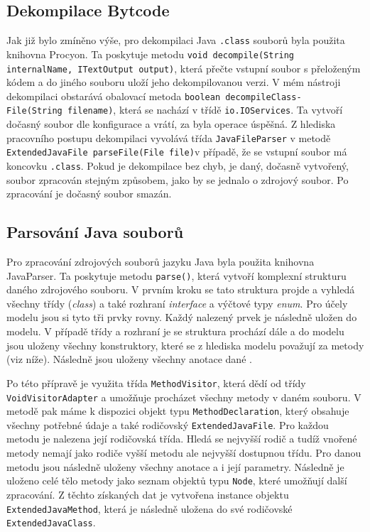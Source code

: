 		\subsection{Dekompilace Bytcode}
			Jak již bylo zmíněno výše, pro dekompilaci Java \texttt{.class} souborů byla použita knihovna Procyon. Ta poskytuje metodu \texttt{void decompile(String internalName, ITextOutput output)}, která přečte vstupní soubor s přeloženým kódem a do jiného souboru uloží jeho dekompilovanou verzi. V mém nástroji dekompilaci obstarává obalovací metoda \texttt{boolean decompileClass-\\File(String filename)}, která se nachází v třídě \texttt{io.IOServices}. Ta vytvoří dočasný soubor dle konfigurace a vrátí, za byla operace úspěšná. Z hlediska pracovního postupu dekompilaci vyvolává třída \texttt{JavaFileParser} v metodě \texttt{ExtendedJavaFile parseFile(File file)}v případě, že se vstupní soubor má koncovku \texttt{.class}. Pokud je dekompilace bez chyb, je daný, dočasně vytvořený, soubor zpracován stejným způsobem, jako by se jednalo o zdrojový soubor. Po zpracování je dočasný soubor smazán.
					

	    \subsection{Parsování Java souborů}	    
			Pro zpracování zdrojových souborů jazyku Java byla použita knihovna JavaParser. Ta poskytuje metodu \texttt{parse()}, která vytvoří komplexní strukturu daného zdrojového souboru. V prvním kroku se tato struktura projde a vyhledá všechny třídy (\emph{class}) a také rozhraní \emph{interface} a výčtové typy \emph{enum}. Pro účely modelu jsou si tyto tři prvky rovny. Každý nalezený prvek je následně uložen do modelu. V případě třídy a rozhraní je se struktura prochází dále a do modelu jsou uloženy všechny konstruktory, které se z hlediska modelu považují za metody (viz níže). Následně jsou uloženy všechny anotace dané .
			
			Po této přípravě je využita třída \texttt{MethodVisitor}, která dědí od třídy \texttt{VoidVisitorAdapter} a umožňuje procházet všechny metody v daném souboru. V metodě pak máme k dispozici objekt typu \texttt{MethodDeclaration}, který obsahuje všechny potřebné údaje a také rodičovský \texttt{ExtendedJavaFile}. Pro každou metodu je nalezena její rodičovská třída. Hledá se nejvyšší rodič a tudíž vnořené metody nemají jako rodiče vyšší metodu ale nejvyšší dostupnou třídu. Pro danou metodu jsou následně uloženy všechny anotace a i její parametry. Následně je uloženo celé tělo metody jako seznam objektů typu \texttt{Node}, které umožňují další zpracování. Z těchto získaných dat je vytvořena instance objektu \texttt{ExtendedJavaMethod}, která je následně uložena do své rodičovské \texttt{ExtendedJavaClass}.


